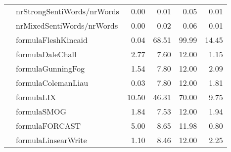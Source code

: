\begin{tabular}{|l|l|r|r|r|r|}
 & nrStrongSentiWords/nrWords & 0.00 & 0.01 & 0.05 & 0.01 \\ \cline{2-6}
 & nrMixedSentiWords/nrWords & 0.00 & 0.02 & 0.06 & 0.01 \\ \hline
\parbox[t]{2mm}{} & formulaFleshKincaid & 0.04 & 68.51 & 99.99 & 14.45 \\ 
 & formulaDaleChall & 2.77 & 7.60 & 12.00 & 1.15 \\ 
 & formulaGunningFog & 1.54 & 7.80 & 12.00 & 2.09 \\ 
 & formulaColemanLiau & 0.03 & 7.80 & 12.00 & 1.81 \\ 
 & formulaLIX & 10.50 & 46.31 & 70.00 & 9.75 \\ 
 & formulaSMOG & 1.84 & 7.53 & 12.00 & 1.94 \\ 
 & formulaFORCAST & 5.00 & 8.65 & 11.98 & 0.80 \\ 
 & formulaLinsearWrite & 1.10 & 8.46 & 12.00 & 2.25 \\ \hline
\end{tabular}